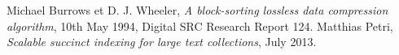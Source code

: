 \begin{thebibliography}{ABC}	
     Michael Burrows et D. J. Wheeler, \emph{A block-sorting lossless data compression algorithm}, 10th May 1994, Digital SRC Research Report 124.
     Matthias Petri, \emph{Scalable succinct indexing for large text collections}, July 2013.
\end{thebibliography}
